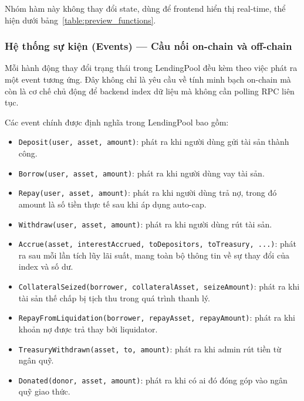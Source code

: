 \documentclass[../DoAn.tex]{subfiles}
\begin{document}
Nhóm hàm này không thay đổi state, dùng để frontend hiển thị real-time, thể hiện dưới bảng~\ref{table:preview_functions}.

\begin{table}[H]
\centering
{}
\caption{Các hàm preview của giao thức}
\label{table:preview_functions}
\end{table}


\subsubsection{Hệ thống sự kiện (Events) --- Cầu nối on-chain và off-chain}


Mỗi hành động thay đổi trạng thái trong LendingPool đều kèm theo việc phát ra một event tương ứng. Đây không chỉ là yêu cầu về tính minh bạch on-chain mà còn là cơ chế chủ động để backend index dữ liệu mà không cần polling RPC liên tục.

Các event chính được định nghĩa trong LendingPool bao gồm:

\begin{itemize}
  \item \texttt{Deposit(user, asset, amount)}: phát ra khi người dùng gửi tài sản thành công.
  \item \texttt{Borrow(user, asset, amount)}: phát ra khi người dùng vay tài sản.
  \item \texttt{Repay(user, asset, amount)}: phát ra khi người dùng trả nợ, trong đó amount là số tiền thực tế sau khi áp dụng auto-cap.
  \item \texttt{Withdraw(user, asset, amount)}: phát ra khi người dùng rút tài sản.
  \item \texttt{Accrue(asset, interestAccrued, toDepositors, toTreasury, ...)}: phát ra sau mỗi lần tích lũy lãi suất, mang toàn bộ thông tin về sự thay đổi của index và số dư.
  \item \texttt{CollateralSeized(borrower, collateralAsset, seizeAmount)}: phát ra khi tài sản thế chấp bị tịch thu trong quá trình thanh lý.
  \item \texttt{RepayFromLiquidation(borrower, repayAsset, repayAmount)}: phát ra khi khoản nợ được trả thay bởi liquidator.
  \item \texttt{TreasuryWithdrawn(asset, to, amount)}: phát ra khi admin rút tiền từ ngân quỹ.
  \item \texttt{Donated(donor, asset, amount)}: phát ra khi có ai đó đóng góp vào ngân quỹ giao thức.
\end{itemize}
\end{document}
